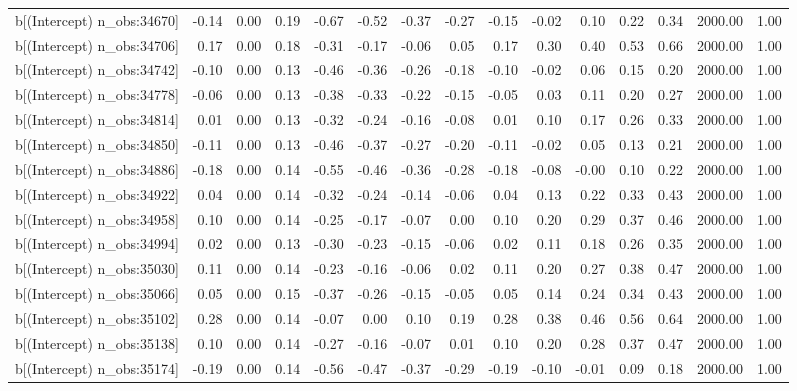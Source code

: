 \begin{table}[ht]
\begin{tabular}{rrrrrrrrrrrrrrr}
  b[(Intercept) n\_obs:34670] & -0.14 & 0.00 & 0.19 & -0.67 & -0.52 & -0.37 & -0.27 & -0.15 & -0.02 & 0.10 & 0.22 & 0.34 & 2000.00 & 1.00 \\ 
  b[(Intercept) n\_obs:34706] & 0.17 & 0.00 & 0.18 & -0.31 & -0.17 & -0.06 & 0.05 & 0.17 & 0.30 & 0.40 & 0.53 & 0.66 & 2000.00 & 1.00 \\ 
  b[(Intercept) n\_obs:34742] & -0.10 & 0.00 & 0.13 & -0.46 & -0.36 & -0.26 & -0.18 & -0.10 & -0.02 & 0.06 & 0.15 & 0.20 & 2000.00 & 1.00 \\ 
  b[(Intercept) n\_obs:34778] & -0.06 & 0.00 & 0.13 & -0.38 & -0.33 & -0.22 & -0.15 & -0.05 & 0.03 & 0.11 & 0.20 & 0.27 & 2000.00 & 1.00 \\ 
  b[(Intercept) n\_obs:34814] & 0.01 & 0.00 & 0.13 & -0.32 & -0.24 & -0.16 & -0.08 & 0.01 & 0.10 & 0.17 & 0.26 & 0.33 & 2000.00 & 1.00 \\ 
  b[(Intercept) n\_obs:34850] & -0.11 & 0.00 & 0.13 & -0.46 & -0.37 & -0.27 & -0.20 & -0.11 & -0.02 & 0.05 & 0.13 & 0.21 & 2000.00 & 1.00 \\ 
  b[(Intercept) n\_obs:34886] & -0.18 & 0.00 & 0.14 & -0.55 & -0.46 & -0.36 & -0.28 & -0.18 & -0.08 & -0.00 & 0.10 & 0.22 & 2000.00 & 1.00 \\ 
  b[(Intercept) n\_obs:34922] & 0.04 & 0.00 & 0.14 & -0.32 & -0.24 & -0.14 & -0.06 & 0.04 & 0.13 & 0.22 & 0.33 & 0.43 & 2000.00 & 1.00 \\ 
  b[(Intercept) n\_obs:34958] & 0.10 & 0.00 & 0.14 & -0.25 & -0.17 & -0.07 & 0.00 & 0.10 & 0.20 & 0.29 & 0.37 & 0.46 & 2000.00 & 1.00 \\ 
  b[(Intercept) n\_obs:34994] & 0.02 & 0.00 & 0.13 & -0.30 & -0.23 & -0.15 & -0.06 & 0.02 & 0.11 & 0.18 & 0.26 & 0.35 & 2000.00 & 1.00 \\ 
  b[(Intercept) n\_obs:35030] & 0.11 & 0.00 & 0.14 & -0.23 & -0.16 & -0.06 & 0.02 & 0.11 & 0.20 & 0.27 & 0.38 & 0.47 & 2000.00 & 1.00 \\ 
  b[(Intercept) n\_obs:35066] & 0.05 & 0.00 & 0.15 & -0.37 & -0.26 & -0.15 & -0.05 & 0.05 & 0.14 & 0.24 & 0.34 & 0.43 & 2000.00 & 1.00 \\ 
  b[(Intercept) n\_obs:35102] & 0.28 & 0.00 & 0.14 & -0.07 & 0.00 & 0.10 & 0.19 & 0.28 & 0.38 & 0.46 & 0.56 & 0.64 & 2000.00 & 1.00 \\ 
  b[(Intercept) n\_obs:35138] & 0.10 & 0.00 & 0.14 & -0.27 & -0.16 & -0.07 & 0.01 & 0.10 & 0.20 & 0.28 & 0.37 & 0.47 & 2000.00 & 1.00 \\ 
  b[(Intercept) n\_obs:35174] & -0.19 & 0.00 & 0.14 & -0.56 & -0.47 & -0.37 & -0.29 & -0.19 & -0.10 & -0.01 & 0.09 & 0.18 & 2000.00 & 1.00 \\ 

\end{tabular}
\end{table}

